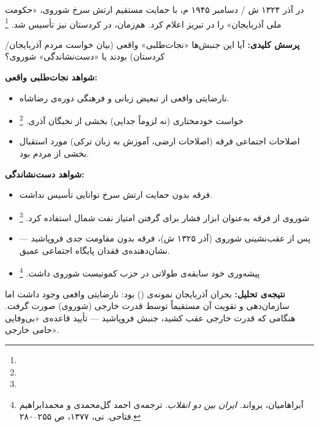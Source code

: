 \begin{tcolorbox}[casebox, title={بحران آذربایجان: نجات‌طلبی یا دست‌نشاندگی؟}]
در آذر ۱۳۲۴ ش / دسامبر ۱۹۴۵ م، با حمایت مستقیم ارتش سرخ شوروی،  «حکومت ملی آذربایجان» را در تبریز اعلام کرد. هم‌زمان، در کردستان نیز  تأسیس شد.%
\footnote{}

\textbf{پرسش کلیدی:} آیا این جنبش‌ها «نجات‌طلبی» واقعی (بیان خواست مردم آذربایجان/کردستان) بودند یا «دست‌نشاندگی» شوروی؟

\textbf{شواهد نجات‌طلبی واقعی:}
\begin{itemize}[nosep, rightmargin=1em]
  \item نارضایتی واقعی از تبعیض زبانی و فرهنگی دوره‌ی رضاشاه.
  \item خواست خودمختاری (نه لزوماً جدایی) بخشی از نخبگان آذری.%
  \footnote{}
  \item اصلاحات اجتماعی فرقه (اصلاحات ارضی، آموزش به زبان ترکی) مورد استقبال بخشی از مردم بود.
\end{itemize}

\textbf{شواهد دست‌نشاندگی:}
\begin{itemize}[nosep, rightmargin=1em]
  \item فرقه بدون حمایت ارتش سرخ توانایی تأسیس نداشت.
  \item شوروی از فرقه به‌عنوان ابزار فشار برای گرفتن امتیاز نفت شمال استفاده کرد.%
  \footnote{}
  \item پس از عقب‌نشینی شوروی (آذر ۱۳۲۵ ش)، فرقه بدون مقاومت جدی فروپاشید — نشان‌دهنده‌ی فقدان پایگاه اجتماعی عمیق.
  \item پیشه‌وری خود سابقه‌ی طولانی در حزب کمونیست شوروی داشت.%
  \footnote{آبراهامیان، یرواند. \textit{ایران بین دو انقلاب}. ترجمه‌ی احمد گل‌محمدی و محمدابراهیم فتاحی. نی، ۱۳۷۷، ص ۲۵۵--۲۸۰.}
\end{itemize}

\textbf{نتیجه‌ی تحلیل:} بحران آذربایجان نمونه‌ی  () بود: نارضایتی واقعی وجود داشت اما سازمان‌دهی و تقویت آن مستقیماً توسط قدرت خارجی (شوروی) صورت گرفت. هنگامی که قدرت خارجی عقب کشید، جنبش فروپاشید — تأیید قاعده‌ی «بی‌وفایی حامی خارجی».
\end{tcolorbox}

